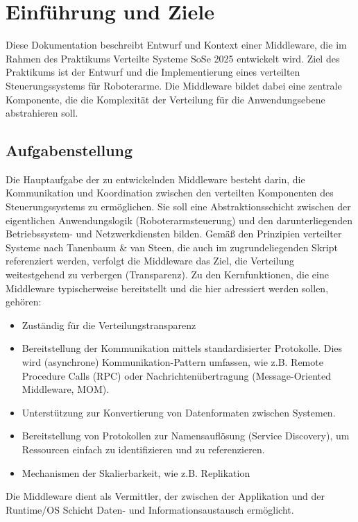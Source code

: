 \chapter{Einführung und Ziele}

Diese Dokumentation beschreibt Entwurf und Kontext einer Middleware, die im Rahmen des Praktikums \glqq Verteilte Systeme SoSe 2025\grqq{} entwickelt wird. Ziel des Praktikums ist der Entwurf und die Implementierung eines verteilten Steuerungssystems für Roboterarme. Die Middleware bildet dabei eine zentrale Komponente, die die Komplexität der Verteilung für die Anwendungsebene abstrahieren soll.


\section{Aufgabenstellung}
Die Hauptaufgabe der zu entwickelnden Middleware besteht darin, die Kommunikation und Koordination zwischen den verteilten Komponenten des Steuerungssystems zu ermöglichen. Sie soll eine Abstraktionsschicht zwischen der eigentlichen Anwendungslogik (Roboterarmsteuerung) und den darunterliegenden Betriebssystem- und Netzwerkdiensten bilden. Gemäß den Prinzipien verteilter Systeme nach Tanenbaum \& van Steen, die auch im zugrundeliegenden Skript referenziert werden, verfolgt die Middleware das Ziel, die Verteilung weitestgehend zu verbergen (Transparenz).
Zu den Kernfunktionen, die eine Middleware typischerweise bereitstellt und die hier adressiert werden sollen, gehören:

\begin{itemize}
	\item Zuständig für die Verteilungstransparenz	
	\item Bereitstellung der Kommunikation mittels standardisierter Protokolle. Dies wird (asynchrone) Kommunikation-Pattern umfassen, wie z.B. Remote Procedure Calls (RPC) oder Nachrichtenübertragung (Message-Oriented Middleware, MOM).
	\item Unterstützung zur Konvertierung von Datenformaten zwischen Systemen.
	\item Bereitstellung von Protokollen zur Namensauflösung (Service Discovery), um Ressourcen einfach zu identifizieren und zu referenzieren.
	\item Mechanismen der Skalierbarkeit, wie z.B. Replikation
\end{itemize}

Die Middleware dient als Vermittler, der zwischen der Applikation und der Runtime/OS Schicht Daten- und Informationsaustausch ermöglicht.


